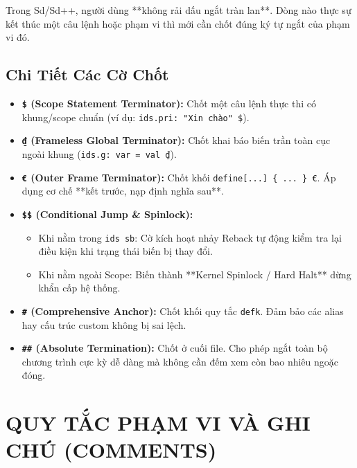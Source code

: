 \documentclass[11pt, a4paper]{article}
\begin{document}
Trong Sd/Sd++, người dùng **không rải dấu ngắt tràn lan**. Dòng nào thực sự kết thúc một câu lệnh hoặc phạm vi thì mới cần chốt đúng ký tự ngắt của phạm vi đó.

\subsection{Chi Tiết Các Cờ Chốt}
\begin{itemize}
    \item \textbf{\texttt{\$} (Scope Statement Terminator):} Chốt một câu lệnh thực thi có khung/scope chuẩn (ví dụ: \texttt{ids.pri: "Xin chào" \$}).
    \item \textbf{\texttt{₫} (Frameless Global Terminator):} Chốt khai báo biến trần toàn cục ngoài khung (\texttt{ids.g: var = val ₫}).
    \item \textbf{\texttt{€} (Outer Frame Terminator):} Chốt khối \texttt{define[...] \{ ... \} €}. Áp dụng cơ chế **kết trước, nạp định nghĩa sau**.
    \item \textbf{\texttt{\$\$} (Conditional Jump \& Spinlock):}
        \begin{itemize}
            \item Khi nằm trong \texttt{ids sb}: Cờ kích hoạt nhảy Reback tự động kiểm tra lại điều kiện khi trạng thái biến bị thay đổi.
            \item Khi nằm ngoài Scope: Biến thành **Kernel Spinlock / Hard Halt** dừng khẩn cấp hệ thống.
        \end{itemize}
    \item \textbf{\texttt{\#} (Comprehensive Anchor):} Chốt khối quy tắc \texttt{defk}. Đảm bảo các alias hay cấu trúc custom không bị sai lệch.
    \item \textbf{\texttt{\#\#} (Absolute Termination):} Chốt ở cuối file. Cho phép ngắt toàn bộ chương trình cực kỳ dễ dàng mà không cần đếm xem còn bao nhiêu ngoặc đóng.
\end{itemize}

\section{QUY TẮC PHẠM VI VÀ GHI CHÚ (COMMENTS)}
\end{document}
